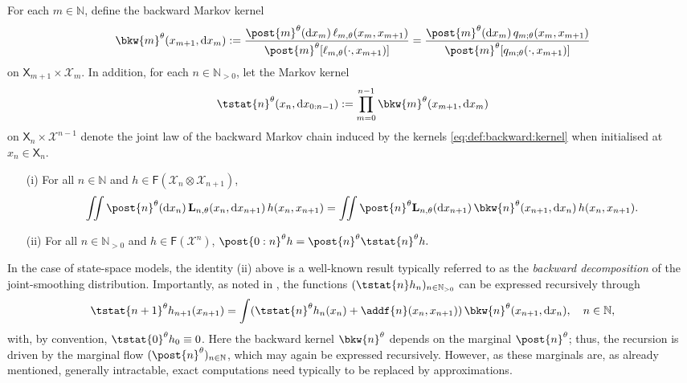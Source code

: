 \documentclass{article}
\newcommand{\Xfd}{\mathcal{X}}
\newcommand{\uksymbol}{\ell}
\newcommand{\ud}[1]{\uksymbol_{#1}}
\newcommand{\nset}{\mathbb{N}}
\newcommand{\nsetpos}{\mathbb{N}_{> 0}}
\newcommand{\1}{\mathbbm{1}}
\newcommand{\uk}[1]{\mathbf{L}_{#1}}
\newcommand{\tensprod}{\otimes}
\newcommand{\Xset}{\mathsf{X}}
\newcommand{\parvec}{\theta}
\newcommand{\bmf}[1]{\set{F}(#1)}
\newcommand{\set}[1]{\mathsf{#1}}
\newcommand{\hd}[1]{q_{#1}}
\newcommand{\rmd}{\ensuremath{\mathrm{d}}}
\newcommand{\eqdef}{\ensuremath{:=}}
\begin{document}
\clearpage
\newpage

For each $m \in \nset$, define the  backward Markov kernel 
\begin{equation} \label{eq:def:backward:kernel}
    \bkw{m}^\parvec(x_{m + 1}, \rmd x_m) \eqdef \frac{\post{m}^\parvec(\rmd x_m) \, \ud{m,\parvec}(x_m, x_{m + 1})}{\post{m}^\parvec[\ud{m,\parvec}(\cdot, x_{m + 1})]} = \frac{\post{m}^\parvec(\rmd x_m) \, \hd{m;\parvec}(x_{m}, x_{m+1})}{\post{m}^\parvec[\hd{m;\parvec}(\cdot, x_{m+1})]}
\end{equation}
on $\Xset_{m + 1} \times \Xfd_m$. In addition, for each $n \in \nsetpos$, let the Markov kernel   
\begin{equation} \label{eq:def:tstat}
\tstat{n}^\parvec(x_n, \rmd x_{0:n - 1}) \eqdef \prod_{m = 0}^{n - 1} \bkw{m}^\parvec(x_{m + 1}, \rmd x_m)
\end{equation}
on $\Xset_n \times \Xfd^{n - 1}$ denote the joint law of the backward Markov chain induced by the kernels \eqref{eq:def:backward:kernel} when initialised at $x_n \in \Xset_n$. 

\begin{itemize} 
\item[(i)]
For all $n \in \nset$ and $h \in \bmf{\Xfd_n \tensprod \Xfd_{n + 1}}$, 
\begin{equation} \label{eq:reversibility}
\iint \post{n}^\parvec(\rmd x_n) \, \uk{n,\parvec}(x_n, \rmd x_{n + 1}) \, h(x_n, x_{n + 1}) = \iint \post{n}^\parvec \uk{n,\parvec}(\rmd x_{n + 1}) \, \bkw{n}^\parvec(x_{n + 1}, \rmd x_n) \, h(x_n, x_{n + 1}). 
\end{equation}
\item[(ii)]
For all $n \in \nsetpos$ and $h \in \bmf{\Xfd^n}$, 
$
\post{0:n}^\parvec h = \post{n}^\parvec \tstat{n}^\parvec h. 
$
\end{itemize}
In the case of state-space models, the identity (ii) above is a well-known result typically referred to as the \emph{backward decomposition} of the joint-smoothing distribution. Importantly, as noted in \cite{cappe:2009}, the functions $(\tstat{n} h_n)_{n \in \nsetpos}$ can be expressed recursively through  
\begin{equation} \label{eq:forward:smoothing}
\tstat{n + 1}^\parvec h_{n + 1}(x_{n + 1}) = \int (\tstat{n}^\parvec h_n(x_n) + \addf{n}(x_n, x_{n + 1})) \, \bkw{n}^\parvec(x_{n + 1}, \rmd x_n), \quad n \in \nset, 
\end{equation}
with, by convention, $\tstat{0}^\parvec h_0 \equiv 0$. Here the backward kernel $\bkw{n}^\parvec$ depends on the marginal $\post{n}^\parvec$; thus, the recursion is driven by the marginal flow $(\post{n}^\parvec)_{n \in \nset}$, which may again be expressed recursively. However, as these marginals are, as already mentioned, generally intractable, exact computations need typically to be replaced by approximations. 
\end{document}
